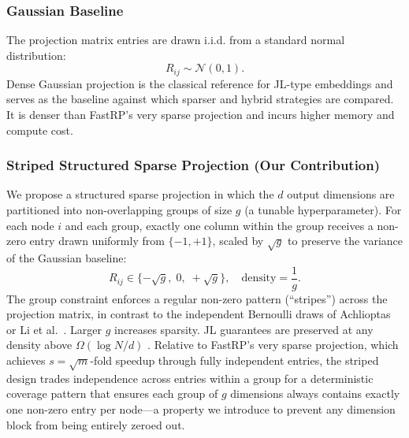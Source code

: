 \documentclass[conference]{IEEEtran}
\begin{document}
\subsubsection{Gaussian Baseline}
The projection matrix entries are drawn i.i.d. from a standard normal
distribution:
\begin{equation}
    R_{ij} \sim \mathcal{N}(0, 1).
\end{equation}
Dense Gaussian projection is the classical reference for JL-type
embeddings \cite{dasgupta1999} and serves as the baseline against which
sparser and hybrid strategies are compared. It is denser than FastRP's
very sparse projection \cite{chen2019fast,li2006very} and incurs higher
memory and compute cost.

\subsubsection{Striped Structured Sparse Projection (Our Contribution)}
We propose a structured sparse projection in which the $d$ output
dimensions are partitioned into non-overlapping groups of size $g$
(a tunable hyperparameter). For each node $i$ and each group, exactly one
column within the group receives a non-zero entry drawn uniformly from
$\{-1, +1\}$, scaled by $\sqrt{g}$ to preserve the variance of the
Gaussian baseline:
\begin{equation}
    R_{ij} \in \{-\sqrt{g},\; 0,\; +\sqrt{g}\},
    \quad \text{density} = \frac{1}{g}.
    \label{eq:striped}
\end{equation}
The group constraint enforces a regular non-zero pattern (``stripes'')
across the projection matrix, in contrast to the independent Bernoulli
draws of Achlioptas \cite{achlioptas2003} or Li et al.\ \cite{li2006very}.
Larger $g$ increases sparsity. JL guarantees are preserved at any density
above $\Omega(\log N / d)$ \cite{achlioptas2003,johnson1984}. Relative
to FastRP's very sparse projection, which achieves $s = \sqrt{m}$-fold
speedup through fully independent entries, the striped design trades
independence across entries within a group for a deterministic coverage
pattern that ensures each group of $g$ dimensions always contains exactly
one non-zero entry per node---a property we introduce to prevent any
dimension block from being entirely zeroed out.
\end{document}
